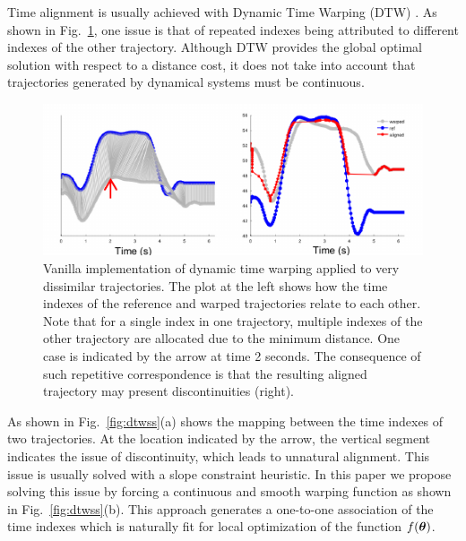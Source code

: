  
Time alignment is usually achieved with Dynamic Time Warping (DTW) \cite{sakoe1978dynamic}.
As shown in Fig.~\ref{fig:dtw}, one issue is that of repeated indexes being attributed to different indexes of the other trajectory.
Although DTW provides the global optimal solution with respect to a distance cost, it does not take into account that trajectories generated by dynamical systems must be continuous. 
 
\begin{figure} 
	\centering
	\includegraphics[scale=1.1, draft=false ]{./figures/dtw.pdf} %
	\caption{
		Vanilla implementation of dynamic time warping applied to very dissimilar trajectories.
		The plot at the left shows how the time indexes of the reference and warped trajectories relate to each other.
		Note that for a single index in one trajectory, multiple indexes of the other trajectory are allocated due to the minimum distance. One case is indicated by the arrow at time 2 seconds. The consequence of such repetitive correspondence is that the resulting aligned trajectory may present discontinuities (right).
	}
	\label{fig:dtw}
\end{figure}
 
As shown in Fig.~\ref{fig:dtwss}(a) shows the mapping between the time indexes of two trajectories.
At the location indicated by the arrow, the vertical segment indicates the issue of discontinuity, which leads to unnatural alignment.
This issue is usually solved with a slope constraint heuristic.
In this paper we propose solving this issue by forcing a continuous and smooth warping function as shown in Fig.~\ref{fig:dtwss}(b).
This approach generates a one-to-one association of the time indexes which is naturally fit for local optimization of the function $f(\boldsymbol{\theta})$.

